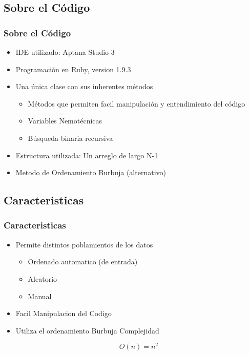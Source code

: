 \documentclass{beamer}
\begin{document}
	\subsection{Sobre el Código}
	\begin{frame}
		\frametitle{Sobre el Código}
			\begin{itemize}[<+->]
				\item IDE utilizado: Aptana Studio 3
				\item Programación en Ruby, version 1.9.3
				\item Una única clase con sus inherentes métodos
				\begin{itemize}[<+->]
					\item Métodos que permiten facil manipulación y entendimiento del código
					\item Variables Nemotécnicas
					\item Búsqueda binaria recursiva
				\end{itemize}
				\item Estructura utilizada: Un arreglo de largo N-1
				\item Metodo de Ordenamiento Burbuja (alternativo)
			\end{itemize}
	\end{frame}

	\subsection{Caracteristicas}
	\begin{frame}
		\frametitle{Caracteristicas}
			\begin{itemize}[<+->]
				\item Permite distintos poblamientos de los datos
				\begin{itemize}[<+->]
					\item Ordenado automatico (de entrada)
					\item Aleatorio
					\item Manual
				\end{itemize}
				\item Facil Manipulacion del Codigo
				\item Utiliza el ordenamiento Burbuja Complejidad 
				\begin{center}
				\begin{equation} O(n) = n^2 \end{equation} 
				\end{center}
			\end{itemize}			
	\end{frame}
	
\end{document}
